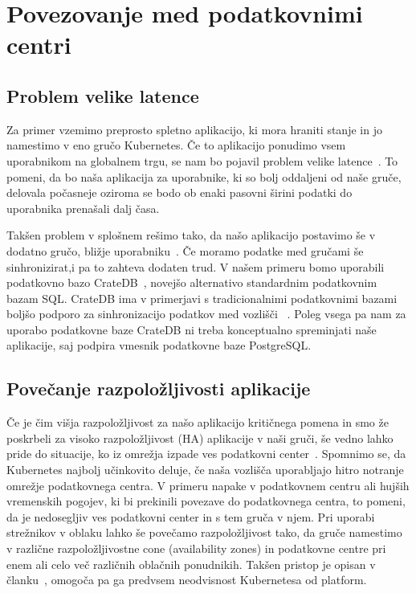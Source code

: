 \documentclass[a4paper, 12pt]{book}
\begin{document}
\chapter{Povezovanje med podatkovnimi centri}
\label{povezovanje-med-centri}
\section{Problem velike latence}
Za primer vzemimo preprosto spletno aplikacijo, ki mora hraniti stanje in jo namestimo v eno gručo Kubernetes.
Če to aplikacijo ponudimo vsem uporabnikom na globalnem trgu, se nam bo pojavil problem velike latence~\cite{minimizing-latency}.
To pomeni, da bo naša aplikacija za uporabnike, ki so bolj oddaljeni od naše gruče, delovala počasneje oziroma se bodo ob enaki pasovni širini podatki do uporabnika prenašali dalj časa.

Takšen problem v splošnem rešimo tako, da našo aplikacijo postavimo še v dodatno gručo, bližje uporabniku~\cite{geo-instability}.
Če moramo podatke med gručami še sinhronizirat,i pa to zahteva dodaten trud.
V našem primeru bomo uporabili podatkovno bazo CrateDB~\cite{cratedb}, novejšo alternativo standardnim podatkovnim bazam SQL.
CrateDB ima v primerjavi s tradicionalnimi podatkovnimi bazami boljšo podporo za sinhronizacijo podatkov med vozlišči ~\cite{databases-comparison}.
Poleg vsega pa nam za uporabo podatkovne baze CrateDB ni treba konceptualno spreminjati naše aplikacije, saj podpira vmesnik podatkovne baze PostgreSQL.
\section{Povečanje razpoložljivosti aplikacije}
Če je čim višja razpoložljivost za našo aplikacijo kritičnega pomena in smo že poskrbeli za visoko razpoložljivost (HA) aplikacije v naši gruči, še vedno lahko pride do situacije, ko iz omrežja izpade ves podatkovni center~\cite{cloud-failures}.
Spomnimo se, da Kubernetes najbolj učinkovito deluje, če naša vozlišča uporabljajo hitro notranje omrežje podatkovnega centra.
V primeru napake v podatkovnem centru ali hujših vremenskih pogojev, ki bi prekinili povezave do podatkovnega centra, to pomeni, da je nedosegljiv ves podatkovni center in s tem gruča v njem.
Pri uporabi strežnikov v oblaku lahko še povečamo razpoložljivost tako, da gruče namestimo v različne razpoložljivostne cone (availability zones) in podatkovne centre pri enem ali celo več različnih oblačnih ponudnikih.
Takšen pristop je opisan v članku~\cite{tosca-fed}, omogoča pa ga predvsem neodvisnost Kubernetesa od platform.
\end{document}
